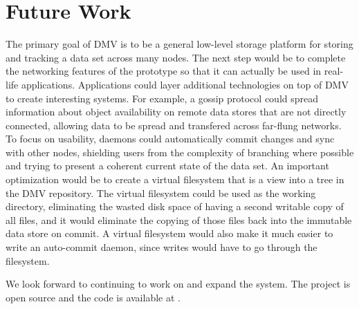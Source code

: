 \section{Future Work}

The primary goal of DMV is to be a general low-level storage platform for
storing and tracking a data set across many nodes. The next step would be to
complete the networking features of the prototype so that it can actually be
used in real-life applications. Applications could layer additional technologies
on top of DMV to create interesting systems. For example, a gossip protocol
could spread information about object availability on remote data stores that
are not directly connected, allowing data to be spread and transfered across
far-flung networks. To focus on usability, daemons could automatically commit
changes and sync with other nodes, shielding users from the complexity of
branching where possible and trying to present a coherent current state of the
data set. An important optimization would be to create a virtual filesystem that
is a view into a tree in the DMV repository. The virtual filesystem could be
used as the working directory, eliminating the wasted disk space of having a
second writable copy of all files, and it would eliminate the copying of those
files back into the immutable data store on commit. A virtual filesystem would
also make it much easier to write an auto-commit daemon, since writes would have
to go through the filesystem.

We look forward to continuing to work on and expand the system. The project is
open source and the code is available at .
